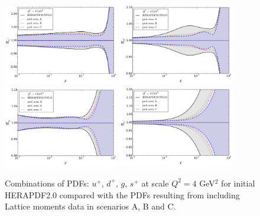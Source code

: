 \begin{figure}[!t]
\centering
\includegraphics[width=0.45\textwidth]{plots/ratio_uPubar_Q2.pdf}
\includegraphics[width=0.45\textwidth]{plots/ratio_dPdbar_Q2.pdf}\\
\includegraphics[width=0.45\textwidth]{plots/ratio_g_Q2.pdf}
\includegraphics[width=0.45\textwidth]{plots/ratio_sPsbar_Q2.pdf}
\caption{\small Combinations of PDFs: $u^+$, $d^+$, $g$, $s^+$ at scale $Q^2=4$ GeV$^2$
for initial HERAPDF2.0 compared with the PDFs resulting from including Lattice moments
data in scenarios A, B and C.}
\label{fig:pdfsProf}
\end{figure}

